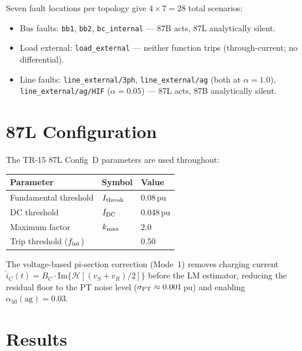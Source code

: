 \documentclass[11pt, a4paper]{article}
\begin{document}
Seven fault locations per topology give $4\times7 = 28$ total scenarios:

\begin{itemize}
  \item Bus faults: \texttt{bb1}, \texttt{bb2}, \texttt{bc\_internal}
        --- 87B acts, 87L analytically silent.
  \item Load external: \texttt{load\_external}
        --- neither function trips (through-current; no differential).
  \item Line faults: \texttt{line\_external/3ph}, \texttt{line\_external/ag}
        (both at $\alpha=1.0$), \texttt{line\_external/ag/HIF}
        ($\alpha=0.05$) --- 87L acts, 87B analytically silent.
\end{itemize}


\section{87L Configuration}
\label{sec:87Lconfig}

The TR-15 87L Config~D parameters are used throughout:

\begin{center}
\begin{tabular}{lll}
  \toprule
  Parameter & Symbol & Value \\
  \midrule
  Fundamental threshold & $I_{\rm thresh}$ & 0.08\,pu \\
  DC threshold          & $I_{\rm DC}$     & 0.048\,pu \\
  Maximum factor        & $k_{\rm max}$    & 2.0 \\
  Trip threshold ($f_{\rm int}$) & & 0.50 \\
  \bottomrule
\end{tabular}
\end{center}

The voltage-based pi-section correction (Mode~1) removes charging current
$\hat{i}_C(t) = B_C \cdot \mathrm{Im}\{\mathcal{H}[(v_S+v_R)/2]\}$ before
the LM estimator, reducing the residual floor to the PT noise level
($\sigma_{\rm PT}\approx0.001$\,pu) and enabling $\alpha_{50}(\text{ag})=0.03$.


\section{Results}
\label{sec:results}
\end{document}
